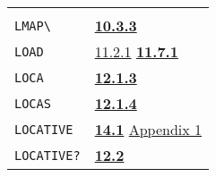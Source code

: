 \documentclass[a4paper,]{article}
\begin{document}
\begin{longtable}[]{@{}ll@{}}
\begin{minipage}[t]{0.70\columnwidth}
\end{minipage}\tabularnewline
\begin{minipage}[t]{0.24\columnwidth}\raggedright\strut
\texttt{LMAP\textbackslash{}}\strut
\end{minipage} & \begin{minipage}[t]{0.70\columnwidth}\raggedright\strut
\textbf{\href{10-looping.md\#1033-mapleave}{10.3.3}}\strut
\end{minipage}\tabularnewline
\begin{minipage}[t]{0.24\columnwidth}\raggedright\strut
\texttt{LOAD}\strut
\end{minipage} & \begin{minipage}[t]{0.70\columnwidth}\raggedright\strut
\href{11-input-output.md\#1121-open}{11.2.1} \textbf{\href{11-input-output.md\#1171-load}{11.7.1}}\strut
\end{minipage}\tabularnewline
\begin{minipage}[t]{0.24\columnwidth}\raggedright\strut
\texttt{LOCA}\strut
\end{minipage} & \begin{minipage}[t]{0.70\columnwidth}\raggedright\strut
\textbf{\href{12-locatives.md\#1213-at}{12.1.3}}\strut
\end{minipage}\tabularnewline
\begin{minipage}[t]{0.24\columnwidth}\raggedright\strut
\texttt{LOCAS}\strut
\end{minipage} & \begin{minipage}[t]{0.70\columnwidth}\raggedright\strut
\textbf{\href{12-locatives.md\#1214-getpl-and-getl}{12.1.4}}\strut
\end{minipage}\tabularnewline
\begin{minipage}[t]{0.24\columnwidth}\raggedright\strut
\texttt{LOCATIVE}\strut
\end{minipage} & \begin{minipage}[t]{0.70\columnwidth}\raggedright\strut
\textbf{\href{14-data-type-declarations.md\#141-patterns}{14.1}}
\href{appendix-1-a-look-inside.md\#appendix-1-a-look-inside}{Appendix 1}\strut
\end{minipage}\tabularnewline
\begin{minipage}[t]{0.24\columnwidth}\raggedright\strut
\texttt{LOCATIVE?}\strut
\end{minipage} & \begin{minipage}[t]{0.70\columnwidth}\raggedright\strut
\textbf{\href{12-locatives.md\#122-locative}{12.2}}\strut
\end{minipage}\tabularnewline

\end{longtable}
\end{document}
